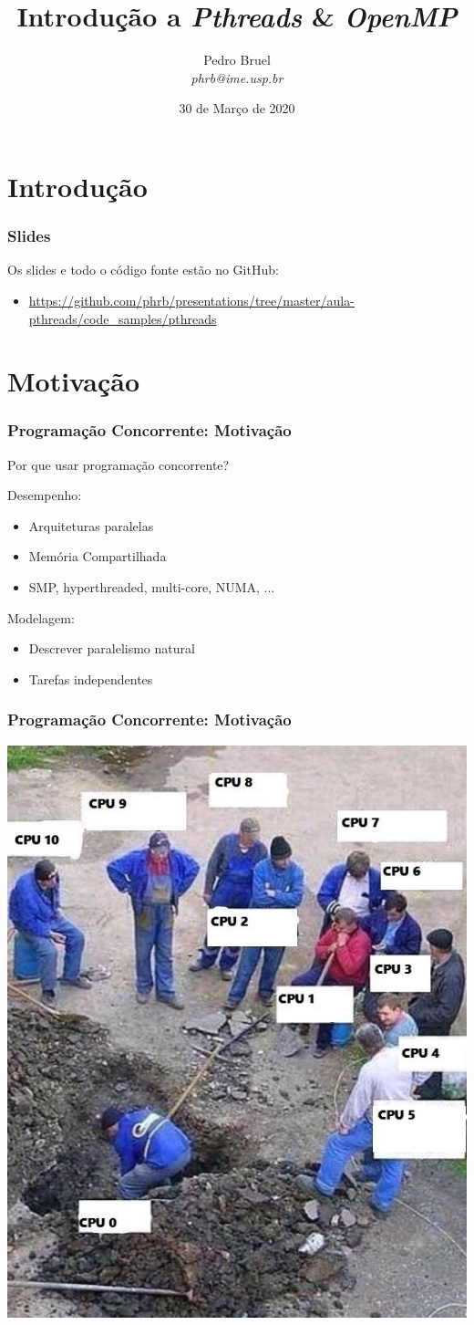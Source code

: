 \documentclass[10pt, compress, aspectratio=169, xcolor={table,usenames,dvipsnames}]{beamer}
\title{Introdução a \textit{Pthreads} \& \textit{OpenMP}}
\author{\footnotesize Pedro Bruel \\ {\scriptsize \emph{phrb@ime.usp.br}}}
\institute{{\large\Biohazard} Versão Quarentena}
\date{\scriptsize 30 de Março de 2020}
\begin{document}
\maketitle

\section*{Introdução}

\begin{frame}
    \frametitle{Slides}
    Os slides e todo o código fonte estão no \alert{GitHub}:

    \begin{itemize}
        \item {\scriptsize\url{https://github.com/phrb/presentations/tree/master/aula-pthreads/code_samples/pthreads}}
    \end{itemize}
\end{frame}

\section{Motivação}

\begin{frame}
    \frametitle{Programação Concorrente: Motivação}
    Por que usar programação concorrente?

    \alert{Desempenho}:
    \begin{itemize}
        \item Arquiteturas paralelas
        \item Memória Compartilhada
        \item SMP, hyperthreaded, multi-core, NUMA, $\dots$
    \end{itemize}

    \alert{Modelagem}:
    \begin{itemize}
        \item Descrever paralelismo natural
        \item Tarefas independentes
    \end{itemize}
\end{frame}

\begin{frame}
    \frametitle{Programação Concorrente: Motivação}
    \begin{center}
        \includegraphics[width=.43\textwidth]{shared_work}
    \end{center}
\end{frame}
\end{document}
